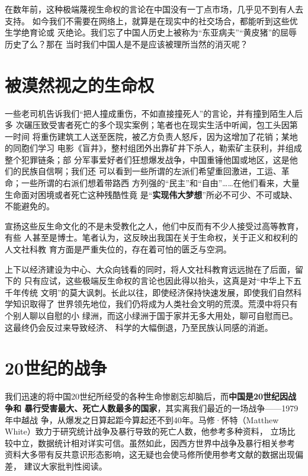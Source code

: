 在数年前，这种极端蔑视生命权的言论在中国没有一丁点市场，几乎见不到有人去支持。
如今我们不需要在网络上，就算是在现实中的社交场合，都能听到这些优生学绝育论或
灭绝论。我们忘了中国人历史上被称为“东亚病夫”“黄皮猪”的屈辱历史了么？那在
当时我们中国人是不是应该被理所当然的消灭呢？

\section{被漠然视之的生命权}

一些老司机告诉我们“把人撞成重伤，不如直接撞死人”的言论，并有撞到陌生人后多
次碾压致受害者死亡的多个现实案例；笔者也在现实生活中听闻，包工头因第一时间
将重伤建筑工人送至医院，被乙方负责人怒斥，因为这增加了花销；某地的同胞们学习
电影《盲井》，整村组团外出靠矿井下杀人，勒索矿主获利，并组成整个犯罪链条；部
分军事爱好者们狂想爆发战争，中国重锤他国或地区，这是他们的民族自信啊；我们还
可以看到一些所谓的左派们希望重回激进，工运、革命；一些所谓的右派们想着带路西
方列强的“民主”和“自由”……在他们看来，大量生命面对困境或者死亡这种残酷性竟
是“\textbf{实现伟大梦想}”所必不可少、不可或缺、不能避免的。

宣扬这些反生命文化的不是未受教化之人，他们中反而有不少人接受过高等教育，有些
人甚至是博士。笔者认为，这反映出我国在关于生命权，关于正义和权利的人文社科教
育方面是严重失位的，存在着可怕的匮乏与空洞。

上下以经济建设为中心、大众向钱看的同时，将人文社科教育远远抛在了后面，留下的
只有应试，这些极端反生命权的言论也因此得以抬头，这真是对“中华上下五千年传统
文明”的莫大讽刺。长此以往，即使经济保持快速发展，即使我们自然科学知识取得了
世界领先地位，我们仍将成为人类社会文明的荒漠。荒漠中将只有个别人聊以自慰的小
绿洲，而这小绿洲于国于家并无多大用处，聊可自慰而已。这最终仍会反过来导致经济、
科学的大幅倒退，乃至民族认同感的消逝。

\section{20世纪的战争}

我们迅速的将中国20世纪所经受的各种生命惨剧忘却脑后，而\textbf{中国是20世纪因战争和
  暴行受害最大、死亡人数最多的国家}，其实离我们最近的一场战争——1979年中越战
争，从爆发之日算起距今算起还不到40年。马修·怀特（Matthew
White）\cite{mattwhite}致力于研究统计战争及暴行导致的死亡人数，他参考多种资料，
立场比较中立，数据统计相对详实可信。虽然如此，因西方世界中战争及暴行相关参考
资料大多带有反共意识形态影响，这无疑也会使马修所使用参考文献的数据出现偏差，
建议大家批判性阅读。


